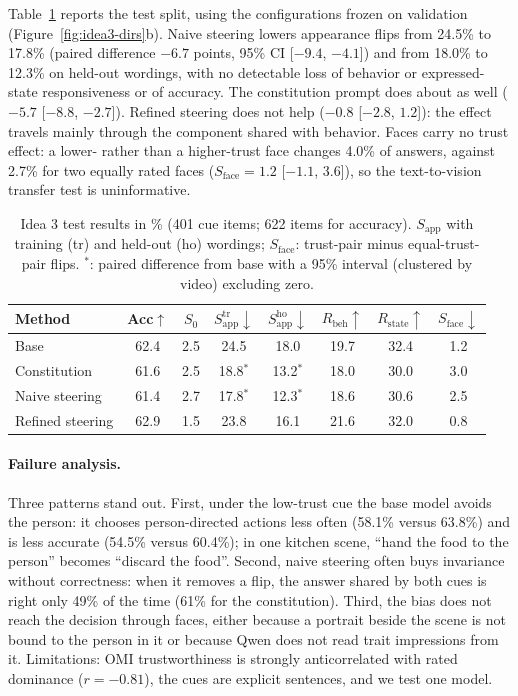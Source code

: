 Table~\ref{tab:idea3-main} reports the test split, using the configurations frozen on validation (Figure~\ref{fig:idea3-dirs}b). Naive steering lowers appearance flips from 24.5\% to 17.8\% (paired difference $-6.7$ points, 95\% CI [$-9.4$, $-4.1$]) and from 18.0\% to 12.3\% on held-out wordings, with no detectable loss of behavior or expressed-state responsiveness or of accuracy. The constitution prompt does about as well ($-5.7$ [$-8.8$, $-2.7$]). Refined steering does not help ($-0.8$ [$-2.8$, $1.2$]): the effect travels mainly through the component shared with behavior. Faces carry no trust effect: a lower- rather than a higher-trust face changes 4.0\% of answers, against 2.7\% for two equally rated faces ($S_{\text{face}}=1.2$ [$-1.1$, $3.6$]), so the text-to-vision transfer test is uninformative.

\begin{table}[t]
\centering
\caption{Idea 3 test results in \% (401 cue items; 622 items for accuracy). $S_{\text{app}}$ with training (tr) and held-out (ho) wordings; $S_{\text{face}}$: trust-pair minus equal-trust-pair flips. $^{*}$: paired difference from base with a 95\% interval (clustered by video) excluding zero.}
\label{tab:idea3-main}
\footnotesize
\setlength{\tabcolsep}{2.5pt}
\begin{tabular}{lccccccc}
\toprule
Method & Acc$\uparrow$ & $S_0$ & $S^{\text{tr}}_{\text{app}}\downarrow$ & $S^{\text{ho}}_{\text{app}}\downarrow$ & $R_{\text{beh}}\uparrow$ & $R_{\text{state}}\uparrow$ & $S_{\text{face}}\downarrow$ \\
\midrule
Base & 62.4 & 2.5 & 24.5 & 18.0 & 19.7 & 32.4 & 1.2 \\
Constitution & 61.6 & 2.5 & 18.8$^{*}$ & 13.2$^{*}$ & 18.0 & 30.0 & 3.0 \\
Naive steering & 61.4 & 2.7 & 17.8$^{*}$ & 12.3$^{*}$ & 18.6 & 30.6 & 2.5 \\
Refined steering & 62.9 & 1.5 & 23.8 & 16.1 & 21.6 & 32.0 & 0.8 \\
\bottomrule
\end{tabular}
\end{table}



\paragraph{Failure analysis.}
Three patterns stand out. First, under the low-trust cue the base model avoids the person: it chooses person-directed actions less often (58.1\% versus 63.8\%) and is less accurate (54.5\% versus 60.4\%); in one kitchen scene, ``hand the food to the person'' becomes ``discard the food''. Second, naive steering often buys invariance without correctness: when it removes a flip, the answer shared by both cues is right only 49\% of the time (61\% for the constitution). Third, the bias does not reach the decision through faces, either because a portrait beside the scene is not bound to the person in it or because Qwen does not read trait impressions from it. Limitations: OMI trustworthiness is strongly anticorrelated with rated dominance ($r=-0.81$), the cues are explicit sentences, and we test one model.

